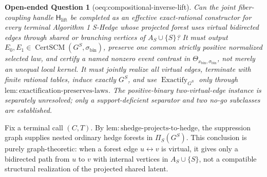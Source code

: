 \documentclass{article}
\newtheorem{openendedquestion}{Open-ended Question}
\begin{document}
\begin{openendedquestion}[oeq:compositional-inverse-lift]\label{oeq:compositional-inverse-lift}
Can the joint fiber-coupling handle \(\mathsf H_{\mathrm{lift}}\) be completed as an effective exact-rational constructor for every terminal Algorithm 1 S-Hedge whose projected forest uses virtual bidirected edges through shared or branching vertices of \(A_S\cup\{S\}\)? It must output \(E_0,E_1\in\operatorname{CertSCM}(G^S,\sigma_{\mathrm{bin}})\), preserve one common strictly positive normalized selected law, and certify a named nonzero event contrast in \(\Theta_{x_{\mathrm{bin}},\sigma_{\mathrm{bin}}}\), not merely an unequal local kernel. It must jointly realize all virtual edges, terminate with finite rational tables, induce exactly \(G^S\), and use \(\operatorname{Exactify}_{G^S}\) only through \(\mathrm{lem:exactification\text{-}preserves\text{-}laws}\). The positive-binary two-virtual-edge instance is separately unresolved; only a support-deficient separator and two no-go subclasses are established.
\end{openendedquestion}
Fix a terminal call \((C,T)\). By \(\mathrm{lem:shedge\text{-}projects\text{-}to\text{-}hedge}\), the suppression graph supplies nested ordinary hedge forests in \(\Pi_S(G^S)\). This conclusion is purely graph-theoretic: when a forest edge \(u\leftrightarrow v\) is virtual, it gives only a bidirected path from \(u\) to \(v\) with internal vertices in \(A_S\cup\{S\}\), not a compatible structural realization of the projected shared latent.
\end{document}
